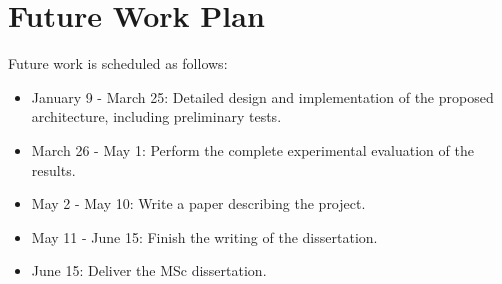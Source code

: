 

\section{Future Work Plan}
\label{sec:workplan}

Future work is scheduled as follows:

\begin{itemize}
	\item January 9 - March 25: Detailed design and implementation of the
	proposed architecture, including preliminary tests.
	\item March 26 - May 1: Perform the complete experimental evaluation
	of the results.
	\item May 2 - May 10: Write a paper describing the project.
	\item May 11 - June 15: Finish the writing of the dissertation.
	\item June 15: Deliver the MSc dissertation.
\end{itemize}

%			
%			
%			
%			
